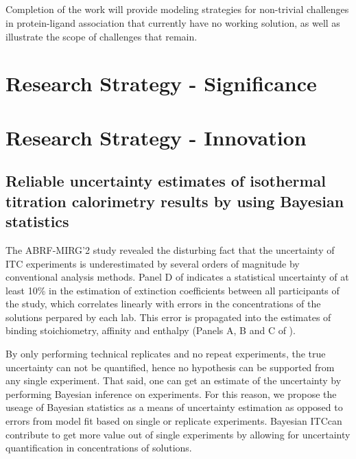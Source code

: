 \documentclass[10pt,final]{article}
\newif\ifinstr
\newcommand{\instr}[1]{\ifdraft{\ifinstr {\color{cyan}\emph{#1}} \fi}{}}
\begin{document}
\subsection*{} %

Completion of the work will provide modeling strategies for non-trivial challenges in protein-ligand association that currently have no working solution, as well as illustrate the scope of challenges that remain.

\section*{Research Strategy - Significance}
\instr{General background, significance in terms of basic science and disease relevance.}


\section*{Research Strategy - Innovation}
\instr{Explain how your proposal differs from what others have tried.}
\subsection*{Reliable uncertainty estimates of isothermal titration calorimetry results by using Bayesian statistics}
The ABRF-MIRG'2 study revealed the disturbing fact that the uncertainty of ITC experiments is underestimated by several orders of magnitude by conventional analysis methods\cite{Myszka2003a}. Panel D of  indicates a statistical uncertainty of at least 10\% in the estimation of extinction coefficients between all participants of the study, which correlates linearly with errors in the concentrations of the solutions perpared by each lab. This error is propagated into the estimates of binding stoichiometry, affinity and enthalpy  (Panels A, B and C of ).

By only performing technical replicates  and no repeat experiments, the true uncertainty can not be quantified, hence no hypothesis can be supported from any single experiment\cite{Vaux2012a}. That said, one can get an estimate of the uncertainty by performing Bayesian inference on experiments. For this reason, we propose the useage of Bayesian statistics as a means of uncertainty estimation as opposed to errors from model fit based on single or replicate experiments. Bayesian ITC\texttrademark can contribute to get more value out of single experiments by allowing for uncertainty quantification in concentrations of solutions. 
\end{document}
